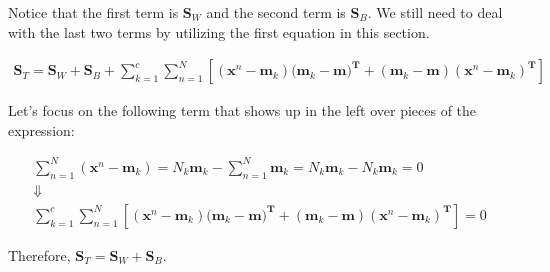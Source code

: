 \documentclass[12pt, letterpaper]{article}
\begin{document}
Notice that the first term is $\mathbf{S}_{W}$ and the second term is 
$\mathbf{S}_{B}$. We still need to deal with the last two terms by utilizing the first equation in this section.

\begin{multline}
\mathbf{S}_{T}= \mathbf{S}_{W} + \mathbf{S}_{B}
+ \sum_{k=1}^{c} \sum_{n=1}^{N}[(\mathbf{x}^{n}-\mathbf{m}_{k})({\mathbf{m}_{k}-\mathbf{m})^{\mathbf{T}}+(\mathbf{m}_{k}-\mathbf{m})(\mathbf{x}^{n}-\mathbf{m}_{k})^{\mathbf{T}}}] 
\end{multline}

Let's focus on the following term that shows up in the left over pieces of the expression:

\begin{multline}
\sum_{n=1}^{N}(\mathbf{x}^{n}-\mathbf{m}_{k}) = N_k \mathbf{m}_k-\sum_{n=1}^{N}\mathbf{m}_{k} = N_k \mathbf{m}_k - N_k \mathbf{m}_k = 0 \\
\Downarrow \\
\sum_{k=1}^{c} \sum_{n=1}^{N}[(\mathbf{x}^{n}-\mathbf{m}_{k})({\mathbf{m}_{k}-\mathbf{m})^{\mathbf{T}}+(\mathbf{m}_{k}-\mathbf{m})(\mathbf{x}^{n}-\mathbf{m}_{k})^{\mathbf{T}}}]  = 0
\end{multline}

Therefore, $\mathbf{S}_{T}= \mathbf{S}_{W} + \mathbf{S}_{B}$. 
\end{document}
